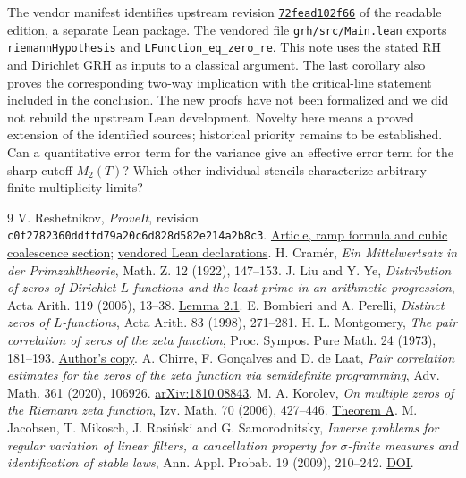 \documentclass[11pt]{article}
\begin{document}
The vendor manifest identifies upstream revision \href{https://github.com/lsernau/grh-lean/tree/72fead102f663d5c7a407964a13dc0cf9d977207}{\texttt{72fead102f66}} of the readable edition, a separate Lean package. The vendored file \texttt{grh/src/Main.lean} exports \texttt{riemannHypothesis} and \texttt{LFunction\_\allowbreak eq\_zero\_re}. This note uses the stated RH and Dirichlet GRH as inputs to a classical argument. The last corollary also proves the corresponding two-way implication with the critical-line statement included in the conclusion. The new proofs have not been formalized and we did not rebuild the upstream Lean development. Novelty here means a proved extension of the identified sources; historical priority remains to be established. Can a quantitative error term for the variance give an effective error term for the sharp cutoff $M_2(T)$? Which other individual stencils characterize arbitrary finite multiplicity limits?

\begin{thebibliography}{9}
 V. Reshetnikov, \emph{ProveIt}, revision \texttt{c0f2782360ddffd79a20c6d828d582e214a2b8c3}.
\href{https://github.com/VladimirReshetnikov/ProveIt/blob/c0f2782360ddffd79a20c6d828d582e214a2b8c3/Analysis/GeneralizedRiemannHypothesis/Article/sections/zer.tex}{Article, ramp formula and cubic coalescence section};
\href{https://github.com/VladimirReshetnikov/ProveIt/blob/c0f2782360ddffd79a20c6d828d582e214a2b8c3/Analysis/GeneralizedRiemannHypothesis/vendor/grh-lean/grh/src/Main.lean}{vendored Lean declarations}.
 H. Cram\'er, \emph{Ein Mittelwertsatz in der Primzahltheorie}, Math. Z. 12 (1922), 147--153.
 J. Liu and Y. Ye, \emph{Distribution of zeros of Dirichlet $L$-functions and the least prime in an arithmetic progression}, Acta Arith. 119 (2005), 13--38. \href{https://www.impan.pl/shop/publication/transaction/download/product/83731}{Lemma 2.1}.
 E. Bombieri and A. Perelli, \emph{Distinct zeros of $L$-functions}, Acta Arith. 83 (1998), 271--281.
 H. L. Montgomery, \emph{The pair correlation of zeros of the zeta function}, Proc. Sympos. Pure Math. 24 (1973), 181--193. \href{https://public.websites.umich.edu/~hlm/paircor1.pdf}{Author's copy}.
 A. Chirre, F. Gon\c calves and D. de Laat, \emph{Pair correlation estimates for the zeros of the zeta function via semidefinite programming}, Adv. Math. 361 (2020), 106926. \href{https://arxiv.org/abs/1810.08843}{arXiv:1810.08843}.
 M. A. Korolev, \emph{On multiple zeros of the Riemann zeta function}, Izv. Math. 70 (2006), 427--446. \href{https://doi.org/10.1070/IM2006v070n03ABEH002317}{Theorem A}.
 M. Jacobsen, T. Mikosch, J. Rosi\'nski and G. Samorodnitsky, \emph{Inverse problems for regular variation of linear filters, a cancellation property for $\sigma$-finite measures and identification of stable laws}, Ann. Appl. Probab. 19 (2009), 210--242. \href{https://doi.org/10.1214/08-AAP540}{DOI}.
\end{thebibliography}
\end{document}
